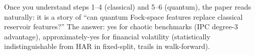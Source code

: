 \documentclass[11pt]{article}
\begin{document}
Once you understand steps 1--4 (classical) and 5--6 (quantum), the paper
reads naturally: it is a story of ``can quantum Fock-space features replace
classical reservoir features?'' The answer: yes for chaotic benchmarks
(IPC degree-3 advantage), approximately-yes for financial volatility
(statistically indistinguishable from HAR in fixed-split, trails in walk-forward).
\end{document}
